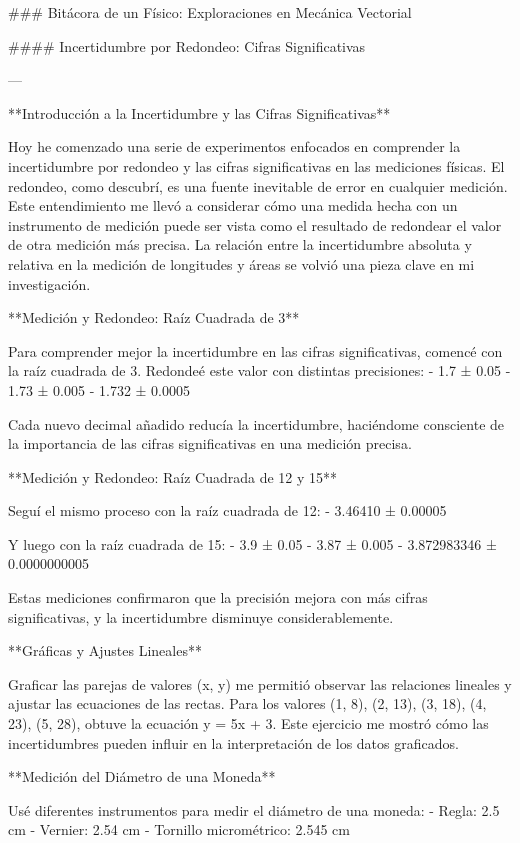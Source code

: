 \documentclass[journal]{IEEEtran}
\begin{document}
### Bitácora de un Físico: Exploraciones en Mecánica Vectorial

#### Incertidumbre por Redondeo: Cifras Significativas

---

**Introducción a la Incertidumbre y las Cifras Significativas**

Hoy he comenzado una serie de experimentos enfocados en comprender la incertidumbre por redondeo y las cifras significativas en las mediciones físicas. El redondeo, como descubrí, es una fuente inevitable de error en cualquier medición. Este entendimiento me llevó a considerar cómo una medida hecha con un instrumento de medición puede ser vista como el resultado de redondear el valor de otra medición más precisa. La relación entre la incertidumbre absoluta y relativa en la medición de longitudes y áreas se volvió una pieza clave en mi investigación.

**Medición y Redondeo: Raíz Cuadrada de 3**

Para comprender mejor la incertidumbre en las cifras significativas, comencé con la raíz cuadrada de 3. Redondeé este valor con distintas precisiones:
- 1.7 ± 0.05
- 1.73 ± 0.005
- 1.732 ± 0.0005

Cada nuevo decimal añadido reducía la incertidumbre, haciéndome consciente de la importancia de las cifras significativas en una medición precisa.

**Medición y Redondeo: Raíz Cuadrada de 12 y 15**

Seguí el mismo proceso con la raíz cuadrada de 12:
- 3.46410 ± 0.00005

Y luego con la raíz cuadrada de 15:
- 3.9 ± 0.05
- 3.87 ± 0.005
- 3.872983346 ± 0.0000000005

Estas mediciones confirmaron que la precisión mejora con más cifras significativas, y la incertidumbre disminuye considerablemente.

**Gráficas y Ajustes Lineales**

Graficar las parejas de valores (x, y) me permitió observar las relaciones lineales y ajustar las ecuaciones de las rectas. Para los valores (1, 8), (2, 13), (3, 18), (4, 23), (5, 28), obtuve la ecuación y = 5x + 3. Este ejercicio me mostró cómo las incertidumbres pueden influir en la interpretación de los datos graficados.

**Medición del Diámetro de una Moneda**

Usé diferentes instrumentos para medir el diámetro de una moneda:
- Regla: 2.5 cm
- Vernier: 2.54 cm
- Tornillo micrométrico: 2.545 cm
\end{document}
